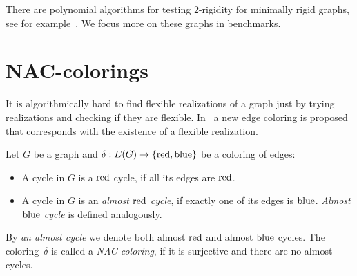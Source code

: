 

There are polynomial algorithms for testing \( 2 \)-rigidity
for minimally rigid graphs, see for example~\cite{polynomial-min-rigid}.
We focus more on these graphs in benchmarks.


\section{NAC-colorings}

It is algorithmically hard to find flexible realizations of a graph
just by trying realizations and checking if they are flexible.
In~\cite{legersky_original} a new edge coloring is proposed
that corresponds with the existence of a flexible realization.


\begin{definition}
	Let \( G \) be a graph and \( \delta: E(G) \to \{ \text{red}, \text{blue} \} \)
	be a coloring of edges:
	\begin{itemize}
		\item A cycle in \( G \) is a \( \text{red} \) cycle, if all its edges are \( \text{red} \).
		\item A cycle in \( G \) is an \emph{almost \( \text{red} \) cycle},
		      if exactly one of its edges is \( \text{blue} \).
		      \emph{Almost \( \text{blue} \) cycle} is defined analogously.
	\end{itemize}
	By \emph{an almost cycle} we denote both almost \( \text{red} \) and almost \( \text{blue} \) cycles.
	The coloring~\( \delta \) is called a \emph{NAC-coloring}, if it is surjective
	and there are no almost cycles.
\end{definition}
%

